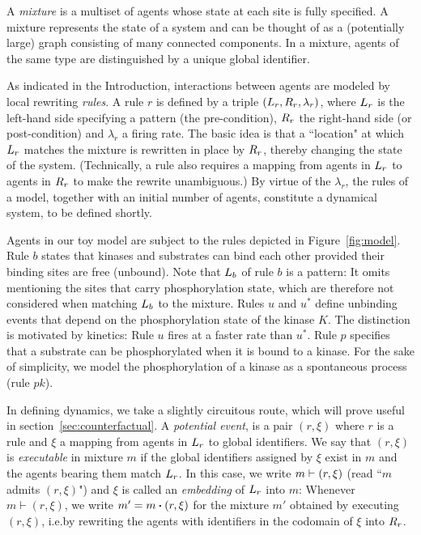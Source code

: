 A \emph{mixture} is a multiset of agents whose state at each site is
fully specified. A mixture represents the state of a system and can be
thought of as a (potentially large) graph consisting of many connected
components. In a mixture, agents of the same type are distinguished by
a unique global identifier.



As indicated in the Introduction, interactions between agents are
modeled by local rewriting \emph{rules}.  A rule $r$ is defined by a
triple $(L_{r}, R_{r}, \lambda_r)$, where $L_{r}$ is the
left-hand side specifying a pattern (the pre-condition), $R_{r}$
the right-hand side (or post-condition) and $\lambda_r$ a firing rate.
The basic idea is that a ``location" at which $L_{r}$ matches the
mixture is rewritten in place by $R_{r}$, thereby changing the
state of the system. (Technically, a rule also requires a mapping from
agents in $L_{r}$ to agents in $R_{r}$ to make the rewrite
unambiguous.) By virtue of the $\lambda_r$, the rules of a model,
together with an initial number of agents, constitute a dynamical
system, to be defined shortly.

Agents in our toy model are subject to the rules depicted in
Figure~\ref{fig:model}. Rule $b$ states that kinases and substrates
can bind each other provided their binding sites are free
(unbound). Note that $L_{b}$ of rule $b$ is a pattern: It omits
mentioning the sites that carry phosphorylation state, which are
therefore not considered when matching $L_{b}$ to the
mixture. Rules $u$ and $u^{*}$ define unbinding events that depend on
the phosphorylation state of the kinase $K$. The distinction is
motivated by kinetics: Rule $u$ fires at a faster rate than $u^{*}$.
Rule $p$ specifies that a substrate can be phosphorylated when it is
bound to a kinase. For the sake of simplicity, we model the
phosphorylation of a kinase as a spontaneous process (rule $pk$).



In defining dynamics, we take a slightly circuitous route, which will
prove useful in section~\ref{sec:counterfactual}. A \emph{potential
  event}, is a pair $(r, \xi)$ where $r$ is a rule and $\xi$ a mapping
from agents in $L_{r}$ to global identifiers. We say that
$(r, \xi)$ is \emph{executable} in mixture $m$ if the global
identifiers assigned by $\xi$ exist in $m$ and the agents bearing them
match $L_{r}$. In this case, we write $m \vdash (r, \xi)$
(read ``$m$ admits $(r, \xi)$") and $\xi$ is called an
\emph{embedding} of $L_{r}$ into $m$:
Whenever $m \vdash (r, \xi)$, we write $m'=\UPDATE{m}{(r, \xi)}$ for
the mixture $m'$ obtained by executing $(r, \xi)$, i.e.\@ by rewriting
the agents with identifiers in the codomain of $\xi$ into $R_{r}$.

